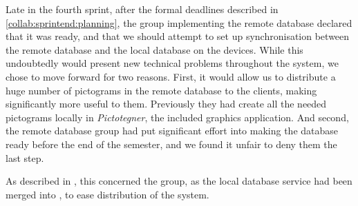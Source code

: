 Late in the fourth sprint, after the formal deadlines described in \cref{collab:sprintend:planning}, the group implementing the remote database declared that it was ready, and that we should attempt to set up synchronisation between the remote database and the local database on the devices. 
While this undoubtedly would present new technical problems throughout the system, we chose to move forward for two reasons. First, it would allow us to distribute a huge number of pictograms in the remote database to the clients, making \giraf significantly more useful to them. Previously they had create all the needed pictograms locally in \textit{Pictotegner}, the included graphics application. And second, the remote database group had put significant effort into making the database ready before the end of the semester, and we found it unfair to deny them the last step. 

As described in , this concerned the \launcher group, as the local database service had been merged into \launcher, to ease distribution of the system.

